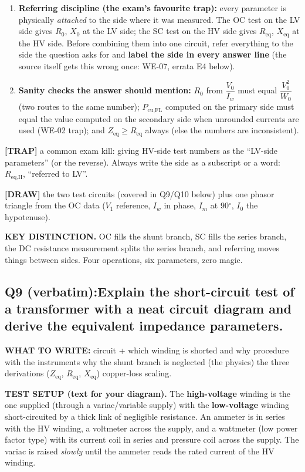 \documentclass[11pt]{article}
\newcommand{\qhead}[2]{\subsection*{\color{copper}#1\quad\color{iron}#2}}
\newcommand{\tagline}[1]{\textbf{\color{copper}#1}}
\newcommand{\keydist}[1]{\vspace{2pt}\textbf{\color{red}KEY DISTINCTION.} #1}
\newcommand{\drawline}[1]{\textbf{\color{muted}[DRAW]} #1}
\newcommand{\trap}[1]{\vspace{2pt}\textbf{\color{red}[TRAP]} #1}
\begin{document}
\begin{enumerate}[label=\arabic*.]
\item \textbf{Referring discipline (the exam's favourite trap):} every parameter is physically \emph{attached} to the side where it was measured. The OC test on the LV side gives $R_0$, $X_0$ at the LV side; the SC test on the HV side gives $R_{\text{eq}}$, $X_{\text{eq}}$ at the HV side. Before combining them into one circuit, refer everything to the side the question asks for and \textbf{label the side in every answer line} (the source itself gets this wrong once: WE-07, errata E4 below).
\item \textbf{Sanity checks the answer should mention:} $R_0$ from $\dfrac{V_0}{I_w}$ must equal $\dfrac{V_0^{2}}{W_0}$ (two routes to the same number); $P_{\text{cu,FL}}$ computed on the primary side must equal the value computed on the secondary side when unrounded currents are used (WE-02 trap); and $Z_{\text{eq}} \geq R_{\text{eq}}$ always (else the numbers are inconsistent).
\end{enumerate}

\trap{a common exam kill: giving HV-side test numbers as the ``LV-side parameters'' (or the reverse). Always write the side as a subscript or a word: $R_{\text{eq,H}}$, ``referred to LV''.}

\drawline{the two test circuits (covered in Q9/Q10 below) plus one phasor triangle from the OC data ($V_1$ reference, $I_w$ in phase, $I_m$ at 90$^\circ$, $I_0$ the hypotenuse).}

\keydist{OC fills the shunt branch, SC fills the series branch, the DC resistance measurement splits the series branch, and referring moves things between sides. Four operations, six parameters, zero magic.}

\qhead{Q9 (verbatim):}{Explain the short-circuit test of a transformer with a neat circuit diagram and derive the equivalent impedance parameters.}

\tagline{WHAT TO WRITE:} circuit + which winding is shorted and why \textrightarrow{} procedure with the instruments \textrightarrow{} why the shunt branch is neglected (the physics) \textrightarrow{} the three derivations ($Z_{\text{eq}}$, $R_{\text{eq}}$, $X_{\text{eq}}$) \textrightarrow{} copper-loss scaling.

\tagline{TEST SETUP (text for your diagram).} The \textbf{high-voltage} winding is the one supplied (through a variac/variable supply) with the \textbf{low-voltage} winding short-circuited by a thick link of negligible resistance. An ammeter is in series with the HV winding, a voltmeter across the supply, and a wattmeter (low power factor type) with its current coil in series and pressure coil across the supply. The variac is raised \emph{slowly} until the ammeter reads the rated current of the HV winding.
\end{document}
